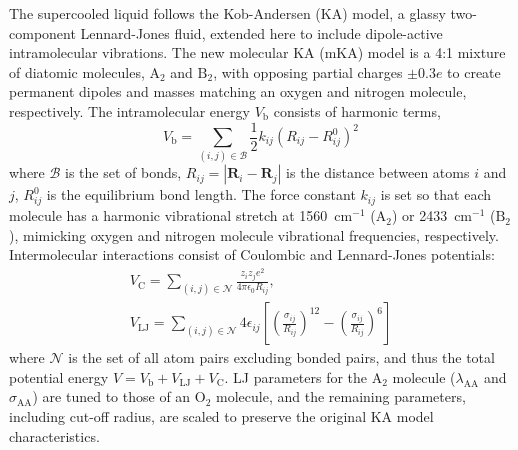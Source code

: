 \documentclass[%
 reprint,
 amsmath,amssymb,
 aps,
]{revtex4-2}
\begin{document}
The supercooled liquid follows the Kob-Andersen (KA) model, a glassy two-component Lennard-Jones fluid, extended here to include dipole-active intramolecular vibrations.  
The new molecular KA (mKA) model is a 4:1 mixture of diatomic molecules, $\mathrm{A}_2$ and $\mathrm{B}_2$, with opposing partial charges $\pm 0.3e$ to create permanent dipoles and masses matching an oxygen and nitrogen molecule, respectively.
The intramolecular energy $V_\mathrm{b}$ consists of harmonic terms,
\begin{equation}
V_\mathrm{b} = \sum_{(i,j) \in \mathcal{B}} \frac{1}{2} k_{ij} \left(R_{ij}-R^0_{ij}\right)^2
\end{equation}
where $\mathcal{B}$ is the set of bonds, $R_{ij}=|\bm{R}_i-\bm{R}_j|$ is the distance between atoms $i$ and $j$, $R^0_{ij}$ is the equilibrium bond length. 
The force constant $k_{ij}$ is set so that each molecule has a harmonic vibrational stretch at 1560~cm$^{-1}$ ($\mathrm{A}_2$) or 2433~cm$^{-1}$ ($\mathrm{B}_2$), mimicking  oxygen and nitrogen molecule vibrational frequencies, respectively. 
Intermolecular interactions consist of Coulombic and Lennard-Jones potentials:
\begin{gather}
V_\mathrm{C} = \sum_{(i,j) \in \mathcal{N}} \frac{z_i z_j e^2}{4 \pi \epsilon_0 R_{ij}}, \\
V_\mathrm{LJ} = \sum_{(i,j) \in \mathcal{N}} 4 \epsilon_{ij}\left[\left(\frac{\sigma_{ij}}{R_{ij}}\right)^{12}-\left(\frac{\sigma_{ij}}{R_{ij}}\right)^6\right]
\end{gather}
where $\mathcal{N}$ is the set of all atom pairs excluding bonded pairs, and thus the total potential energy $V= V_\mathrm{b} + V_\mathrm{LJ} +V_\mathrm{C}$.
LJ parameters for the $\mathrm{A}_2$ molecule ($\lambda_\mathrm{AA}$ and $\sigma_\mathrm{AA}$) are tuned to those of an O$_2$ molecule, and the remaining parameters, including cut-off radius,  are scaled to preserve the original KA model characteristics. 
\end{document}
